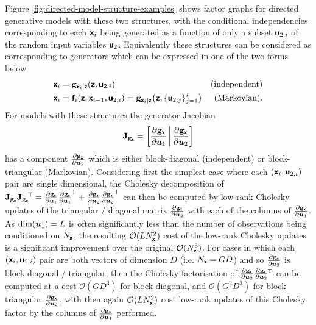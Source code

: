 Figure \ref{fig:directed-model-structure-examples} shows factor graphs for directed generative models with these two structures, with the conditional independencies corresponding to each $\boldsymbol{\mathsf{x}}_i$ being generated as a function of only a subset $\boldsymbol{\mathsf{u}}_{2,i}$ of the random input variables $\boldsymbol{\mathsf{u}}_2$. Equivalently these structures can be considered as corresponding to generators which can be expressed in one of the two forms below
\begin{align}\label{eq:elem_autoreg_model_struct}
    \rvct{x}_i &= \genfunc_{\rvct{x}_i|\rvct{z}}(\rvct{z}, \rvct{u}_{2,i})
    & \text{(independent)}\\
    \rvct{x}_{i} 
    &=
    \vctfunc{f}_i\lpa\rvct{z}, \rvct{x}_{i-1}, \rvct{u}_{2,i}\rpa = 
    \genfunc_{\rvct{x}_i|\rvct{z}}\lpa\rvct{z}, \lbrace\rvct{u}_{2,j}\rbrace^i_{j=1}\rpa & \text{(Markovian).}
\end{align}
For models with these structures the generator Jacobian
\begin{equation}
  \jacobian{\genfunc_{\rvct{x}}} =
  \lsb
   \pd{\genfunc_{\rvct{x}}}{\vct{u}_1} \,\middle|\,
   \pd{\genfunc_{\rvct{x}}}{\vct{u}_2}
  \rsb
\end{equation}
has a component $\frac{\partial {\mathbf{g}}_{\boldsymbol{\mathsf{x}}}}{\partial \boldsymbol{u}_2}$ which is either block-diagonal (independent) or block-triangular (Markovian). Considering first the simplest case where each $(\boldsymbol{\mathsf{x}}_i,\boldsymbol{\mathsf{u}}_{2,i})$ pair are single dimensional, the Cholesky decomposition of $\mathbf{J}_{{\mathbf{g}}_{\boldsymbol{\mathsf{x}}}}\mathbf{J}_{{\mathbf{g}}_{\boldsymbol{\mathsf{x}}}}\phantom{}^{\mkern-1.5mu\mathsf{T}} = \frac{\partial {\mathbf{g}}_{\boldsymbol{\mathsf{x}}}}{\partial \boldsymbol{u}_1}\frac{\partial {\mathbf{g}}_{\boldsymbol{\mathsf{x}}}}{\partial \boldsymbol{u}_1}^{\mkern-1.5mu\mathsf{T}} + \frac{\partial {\mathbf{g}}_{\boldsymbol{\mathsf{x}}}}{\partial \boldsymbol{u}_2} \frac{\partial {\mathbf{g}}_{\boldsymbol{\mathsf{x}}}}{\partial \boldsymbol{u}_2}^{\mkern-1.5mu\mathsf{T}}$ can then be computed by low-rank Cholesky updates of the triangular / diagonal matrix $\frac{\partial {\mathbf{g}}_{\boldsymbol{\mathsf{x}}}}{\partial \boldsymbol{u}_2}$ with each of the columns of $\frac{\partial {\mathbf{g}}_{\boldsymbol{\mathsf{x}}}}{\partial \boldsymbol{u}_1}$. As $\dim(\boldsymbol{u}_1) = L$ is often significantly less than the number of observations being conditioned on $N_{\boldsymbol{\mathsf{x}}}$, the resulting $\mathcal{O}(LN_{\boldsymbol{\mathsf{x}}}^2)$ cost of the low-rank Cholesky updates is a significant improvement over the original $\mathcal{O}(N_{\boldsymbol{\mathsf{x}}}^3)$. For cases in which each $(\boldsymbol{\mathsf{x}}_i,\boldsymbol{\mathsf{u}}_{2,i})$ pair are both vectors of dimension $D$ (i.e. $N_{\boldsymbol{\mathsf{x}}} = GD$) and so $\frac{\partial {\mathbf{g}}_{\boldsymbol{\mathsf{x}}}}{\partial \boldsymbol{u}_2}$ is block diagonal / triangular, then the Cholesky factorisation of  $\frac{\partial {\mathbf{g}}_{\boldsymbol{\mathsf{x}}}}{\partial \boldsymbol{u}_2} \frac{\partial {\mathbf{g}}_{\boldsymbol{\mathsf{x}}}}{\partial \boldsymbol{u}_2}\phantom{}^{\mkern-1.5mu\mathsf{T}}$ can be computed at a cost $\mathcal{O}(G D^3)$ for block diagonal, and $\mathcal{O}(G^2 D^3)$ for block triangular $\frac{\partial {\mathbf{g}}_{\boldsymbol{\mathsf{x}}}}{\partial \boldsymbol{u}_2}$, with then again $\mathcal{O}(LN_{\boldsymbol{\mathsf{x}}}^2)$ cost low-rank updates of this Cholesky factor by the columns of $\frac{\partial {\mathbf{g}}_{\boldsymbol{\mathsf{x}}}}{\partial \boldsymbol{u}_1}$ performed. 

